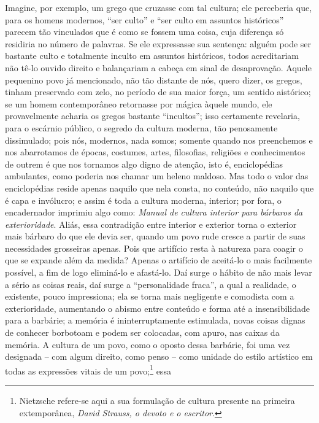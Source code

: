     Imagine, por exemplo, um grego que cruzasse com tal cultura; ele
    perceberia que, para os homens modernos, ``ser culto'' e ``ser culto
    em assuntos históricos'' parecem tão vinculados que é como se fossem
    uma coisa, cuja diferença só residiria no número de palavras. Se ele
    expressasse sua sentença: alguém pode ser bastante culto e
    totalmente inculto em assuntos históricos, todos acreditariam não
    tê-lo ouvido direito e balançariam a cabeça em sinal de
    desaprovação. Aquele pequenino povo já mencionado, não tão distante
    de nós, quero dizer, os gregos, tinham preservado com zelo, no
    período de sua maior força, um sentido aistórico; se um homem
    contemporâneo retornasse por mágica àquele mundo, ele provavelmente
    acharia os gregos bastante ``incultos''; isso certamente revelaria,
    para o escárnio público, o segredo da cultura moderna, tão
    penosamente dissimulado; pois nós, modernos, nada somos; somente
    quando nos preenchemos e nos abarrotamos de épocas, costumes, artes,
    filosofias, religiões e conhecimentos de outrem é que nos tornamos
    algo digno de atenção, isto é, enciclopédias ambulantes, como
    poderia nos chamar um heleno maldoso. Mas todo o valor das
    enciclopédias reside apenas naquilo que nela consta, no conteúdo,
    não naquilo que é capa e invólucro; e assim é toda a cultura
    moderna, interior; por fora, o encadernador imprimiu algo como:
    \emph{Manual de cultura interior para bárbaros da exterioridade}. Aliás,
    essa contradição entre interior e exterior torna o exterior mais
    bárbaro do que ele devia ser, quando um povo rude cresce a partir de
    suas necessidades grosseiras apenas. Pois que artifício resta à
    natureza para coagir o que se expande além da medida? Apenas o
    artifício de aceitá-lo o mais facilmente possível, a fim de logo
    eliminá-lo e afastá-lo. Daí surge o hábito de não mais levar a sério
    as coisas reais, daí surge a ``personalidade fraca'', a qual a
    realidade, o existente, pouco impressiona; ela se torna mais
    negligente e comodista com a exterioridade, aumentando o abismo
    entre conteúdo e forma até a insensibilidade para a barbárie; a
    memória é ininterruptamente estimulada, novas coisas dignas de
    conhecer borbotoam e podem ser colocadas, com apuro, nas caixas da
    memória. A cultura de um povo, como o oposto dessa barbárie, foi uma
    vez designada -- com algum direito, como penso -- como unidade do
    estilo artístico em todas as expressões vitais de um povo;\footnote{Nietzsche
      refere-se aqui a sua formulação de cultura presente na primeira
      extemporânea, \emph{David Strauss, o devoto e o escritor}.}\label{vitaisdeumpovo} essa
